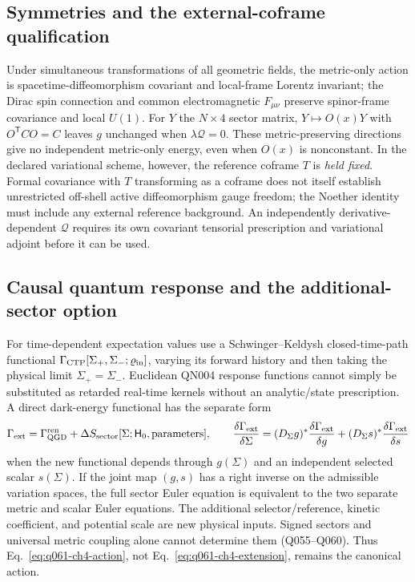 \documentclass[11pt,a4paper]{article}
\begin{document}
\subsection{Symmetries and the external-coframe qualification}
Under simultaneous transformations of all geometric fields, the metric-only action is spacetime-diffeomorphism covariant and local-frame Lorentz invariant; the Dirac spin connection and common electromagnetic $F_{\mu\nu}$ preserve spinor-frame covariance and local $U(1)$. For $Y$ the $N\times4$ sector matrix, $Y\mapsto O(x)Y$ with $O^{\mathsf T}CO=C$ leaves $g$ unchanged when $\lambda\mathcal Q=0$. These metric-preserving directions give no independent metric-only energy, even when $O(x)$ is nonconstant. In the declared variational scheme, however, the reference coframe $T$ is \emph{held fixed}. Formal covariance with $T$ transforming as a coframe does not itself establish unrestricted off-shell active diffeomorphism gauge freedom; the Noether identity must include any external reference background. An independently derivative-dependent $\mathcal Q$ requires its own covariant tensorial prescription and variational adjoint before it can be used.

\subsection{Causal quantum response and the additional-sector option}
For time-dependent expectation values use a Schwinger--Keldysh closed-time-path functional $\Gamma_{\rm CTP}[\Sigma_+,\Sigma_-;\varrho_{\rm in}]$, varying its forward history and then taking the physical limit $\Sigma_+=\Sigma_-$. Euclidean QN004 response functions cannot simply be substituted as retarded real-time kernels without an analytic/state prescription. A direct dark-energy functional has the separate form
\begin{equation}\label{eq:q061-ch4-extension}
\Gamma_{\rm ext}=\Gamma_{\rm QGD}^{\rm ren}+
\Delta S_{\rm sector}[\Sigma;\mathsf H_0,\text{parameters}],
\qquad
\frac{\delta\Gamma_{\rm ext}}{\delta\Sigma}
=(D_\Sigma g)^*\frac{\delta\Gamma_{\rm ext}}{\delta g}
+(D_\Sigma s)^*\frac{\delta\Gamma_{\rm ext}}{\delta s}
\end{equation}
when the new functional depends through $g(\Sigma)$ and an independent selected scalar $s(\Sigma)$. If the joint map $(g,s)$ has a right inverse on the admissible variation spaces, the full sector Euler equation is equivalent to the two separate metric and scalar Euler equations. The additional selector/reference, kinetic coefficient, and potential scale are new physical inputs. Signed sectors and universal metric coupling alone cannot determine them (Q055--Q060). Thus Eq.~\eqref{eq:q061-ch4-action}, not Eq.~\eqref{eq:q061-ch4-extension}, remains the canonical action.
\end{document}
